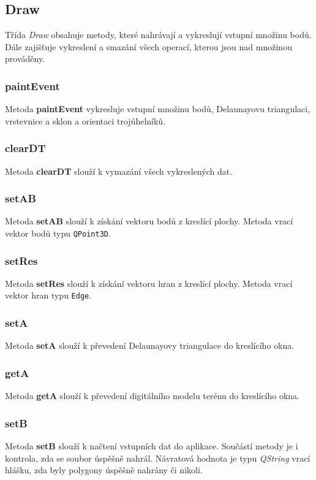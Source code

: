 \documentclass[a4paper, 12pt]{article}
\begin{document}
\subsection{Draw}
Třída \textit{Draw} obsahuje metody, které nahrávají a vykreslují vstupní množinu bodů. Dále zajišťuje vykreslení a smazání všech operací, kterou jsou nad množinou prováděny.

\subsubsection*{paintEvent}
Metoda \textbf{paintEvent} vykresluje vstupní množinu bodů, Delaunayovu triangulaci, vrstevnice a sklon a orientaci trojúhelníků.

\subsubsection*{clearDT}
Metoda \textbf{clearDT} slouží k vymazání všech vykreslených dat.

\subsubsection*{setAB}
Metoda \textbf{setAB} slouží k získání vektoru bodů z kreslící plochy. Metoda vrací vektor bodů typu \texttt{QPoint3D}.

\subsubsection*{setRes}
Metoda \textbf{setRes} slouží k získání vektoru hran z kreslící plochy. Metoda vrací vektor hran typu \texttt{Edge}.

\subsubsection*{setA}
Metoda \textbf{setA} slouží k převedení Delaunayovy triangulace do kreslícího okna.

\subsubsection*{getA}
Metoda \textbf{getA} slouží k převedení digitálního modelu terénu do kreslícího okna.

\subsubsection*{setB}
Metoda \textbf{setB} slouží k načtení vstupních dat do aplikace. Součástí metody je i kontrola, zda se soubor úspěšně nahrál. Návratová hodnota je typu \textsl{QString} vrací hlášku, zda byly polygony úspěšně nahrány či nikoli.
\end{document}
